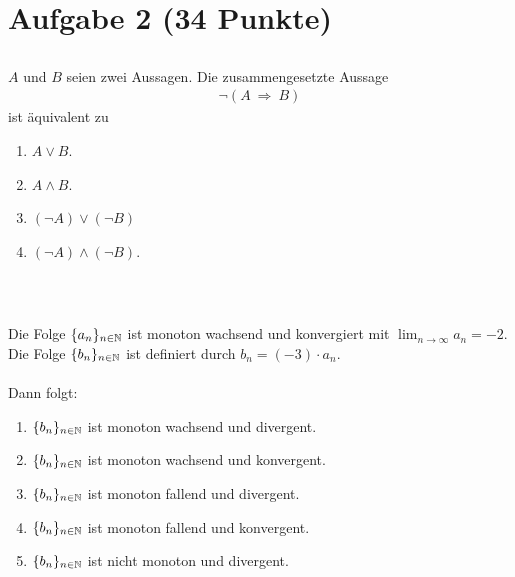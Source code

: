 \section*{Aufgabe 2 (34 Punkte)}
\vspace{0.4cm}

\subsection*{}
$ A $ und $ B $ seien zwei Aussagen. Die zusammengesetzte Aussage
\begin{align*}
	\neg (A \ \Rightarrow \ B)
\end{align*}
ist äquivalent zu 
 \renewcommand{\labelenumi}{(\alph{enumi})}
\begin{enumerate}
\item $ A \vee B $.
\item $ A \wedge B $.
\item $ (\neg A) \vee (\neg B)$
\item $ (\neg A) \wedge (\neg B)$.
\end{enumerate}
\ \\
\subsection*{}
Die Folge $ \lbrace a_n \rbrace_{n \in \mathbb{N}} $ ist monoton wachsend und konvergiert mit $ \lim_{n \to \infty} a_n = -2 $.
Die Folge $ \lbrace b_n \rbrace_{n \in \mathbb{N}} $ ist definiert durch $ b_n = (-3) \cdot a_n $.\\
\\
Dann folgt:
\renewcommand{\labelenumi}{(\alph{enumi})}
\begin{enumerate}
\item $ \lbrace b_n \rbrace_{n \in \mathbb{N}} $ ist monoton wachsend und divergent.
\item $ \lbrace b_n \rbrace_{n \in \mathbb{N}} $ ist monoton wachsend und konvergent.
\item $ \lbrace b_n \rbrace_{n \in \mathbb{N}} $ ist monoton fallend und divergent.
\item $ \lbrace b_n \rbrace_{n \in \mathbb{N}} $ ist monoton fallend und konvergent.
\item $ \lbrace b_n \rbrace_{n \in \mathbb{N}} $ ist nicht monoton und divergent.
\end{enumerate}
\ \\
